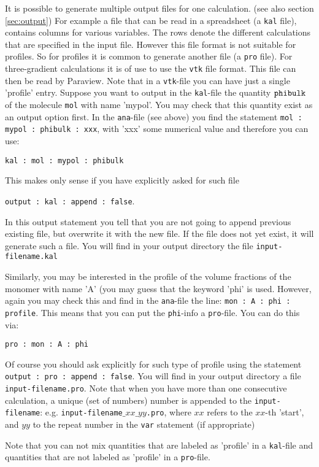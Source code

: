 \documentclass{article}
\begin{document}
It is possible to generate multiple output files for one calculation. (see also section \ref{sec:output})  For example a file that can be read in a spreadsheet (a {\tt kal} file), contains columns for various variables.  The rows denote the different calculations that are specified in the input file.  However this file format is not suitable for profiles.  So for profiles it is common to generate another file (a {\tt pro} file).  For three-gradient calculations it is of use to use the {\tt vtk} file format. This file can then be read by Paraview. Note that in a {\tt vtk}-file you can have just a single 'profile' entry.  
Suppose you want to output in the {\tt kal}-file the quantity $\tt phibulk$ of the molecule {\tt mol} with name 'mypol'. You may check that this quantity exist as an output option first. In the {\tt ana}-file (see above) you find the statement {\tt mol : mypol : phibulk : xxx}, with 'xxx' some numerical value and therefore you can use: 

{\tt kal : mol : mypol : phibulk }

\noindent This makes only sense if you have explicitly asked for such file
 
 {\tt output : kal : append : false}.
 
 \noindent In this output statement you tell that you are not going to append previous existing file, but overwrite it with the new file. If the file does not yet exist, it will generate such a file. You will find in your output directory the file {\tt input-filename.kal}

 Similarly, you may be interested in the profile of the volume fractions of the monomer with name 'A' (you may guess that the keyword 'phi' is used. However, again you may check this and find in the {\tt ana}-file the line: {\tt mon : A : phi : profile}. This means that you can put the {\tt phi}-info a {\tt pro}-file. You can do this via:

 {\tt pro : mon : A : phi}

 Of course you should ask explicitly for such type of profile using the statement {\tt output : pro : append : false}. You will find in your output directory a file {\tt input-filename.pro}. Note that when you have more than one consecutive calculation, a unique (set of numbers) number is appended to the {\tt input-filename}: e.g. {\tt input-filename$\_xx\_yy$.pro}, where $xx$ refers to the $xx$-th 'start', and $yy$ to the repeat number in the {\tt var} statement (if appropriate) 

 Note that you can not mix quantities that are labeled as 'profile' in a {\tt kal}-file and quantities that are not labeled as 'profile' in a {\tt pro}-file. 
\end{document}
